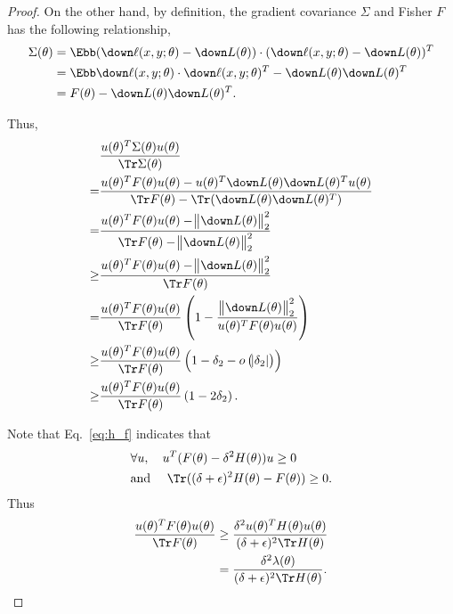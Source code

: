 \documentclass{article}
\begin{document}
\begin{proof}
On the other hand, by definition, the gradient covariance $\Sigma$ and Fisher $F$ has the following relationship,
\begin{equation}
\begin{aligned}
    \Sigma (\theta) &= \Ebb (\down\ell(x,y;\theta) - \down L(\theta))\cdot (\down\ell(x,y;\theta) - \down L(\theta))^T \\
    &= \Ebb \down\ell(x,y;\theta)\cdot \down\ell(x,y;\theta)^T - \down L(\theta)\down L(\theta)^T \\
    &= F(\theta) - \down L(\theta)\down L(\theta)^T.
\end{aligned}
\end{equation}

Thus,
\begin{align}
    &\frac{u(\theta)^T \Sigma(\theta) u(\theta)}{\Tr\Sigma(\theta)} \\
    =& \frac{u(\theta)^T F(\theta) u(\theta) - u(\theta)^T \down L(\theta) \down L(\theta)^T u(\theta)}{\Tr F(\theta)-\Tr(\down L(\theta) \down L(\theta)^T)} \\
    =& \frac{u(\theta)^T F(\theta) u(\theta) - \norm{\down L(\theta)}_2^2}{\Tr F(\theta) - \norm{\down L(\theta)}_2^2} \\
    \ge& \frac{u(\theta)^T F(\theta) u(\theta) - \norm{\down L(\theta)}_2^2}{\Tr F(\theta)} \\
    =& \frac{u(\theta)^T F(\theta) u(\theta)}{\Tr F(\theta)} \left(1-\frac{\norm{\down L(\theta)}_2^2}{u(\theta)^T F(\theta) u(\theta)}\right) \\
    \ge& \frac{u(\theta)^T F(\theta) u(\theta)}{\Tr F(\theta)} \left(1-\delta_2-o\left(\abs{\delta_2}\right)\right) \\
    \ge& \frac{u(\theta)^T F(\theta) u(\theta)}{\Tr F(\theta)} \left(1-2\delta_2\right).
\end{align}

Note that Eq.~\eqref{eq:h_f} indicates that
\begin{align}
    & \forall u,\quad u^T (F(\theta) - \delta^{2} H(\theta)) u \ge 0 \\
    & \text{and }\quad \Tr((\delta+\epsilon)^{2} H(\theta) - F(\theta)) \ge 0.
\end{align}
Thus
\begin{align}
\frac{u(\theta)^T F(\theta) u(\theta)}{\Tr F(\theta)} &\ge \frac{\delta^2  u(\theta)^T H(\theta) u(\theta)}{(\delta+\epsilon)^2 \Tr H(\theta)} \\
& = \frac{\delta^2  \lambda(\theta)}{(\delta+\epsilon)^2 \Tr H(\theta)}.
\end{align}


\end{proof}
\end{document}
